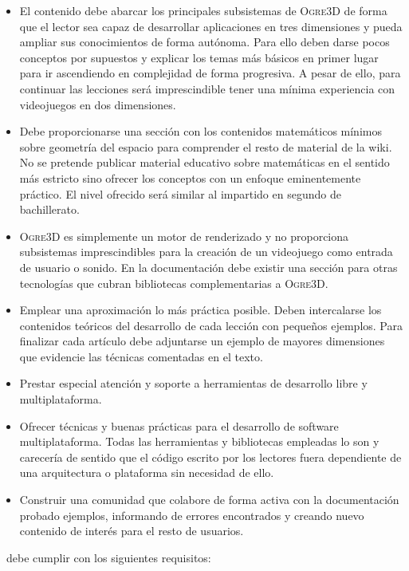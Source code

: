 \begin{itemize}
    \item El contenido debe abarcar los principales subsistemas de
    \textsc{Ogre3D} de forma que el lector sea capaz de desarrollar aplicaciones
    en tres dimensiones y pueda ampliar sus conocimientos de forma autónoma.
    Para ello deben darse pocos conceptos por supuestos y explicar los temas
    más básicos en primer lugar para ir ascendiendo en complejidad de forma
    progresiva. A pesar de ello, para continuar las lecciones será imprescindible
    tener una mínima experiencia con videojuegos en dos dimensiones.
    \item Debe proporcionarse una sección con los contenidos matemáticos
    mínimos sobre geometría del espacio para comprender el resto de material
    de la wiki. No se pretende publicar material educativo sobre matemáticas
    en el sentido más estricto sino ofrecer los conceptos con un enfoque
    eminentemente práctico. El nivel ofrecido será similar al impartido
    en segundo de bachillerato.
    \item \textsc{Ogre3D} es simplemente un motor de renderizado y no
    proporciona subsistemas imprescindibles para la creación de un videojuego
    como entrada de usuario o sonido. En la documentación debe existir una
    sección para otras tecnologías que cubran bibliotecas complementarias
    a \textsc{Ogre3D}.
    \item Emplear una aproximación lo más práctica posible. Deben intercalarse
    los contenidos teóricos del desarrollo de cada lección con pequeños
    ejemplos. Para finalizar cada artículo debe adjuntarse un ejemplo de mayores
    dimensiones que evidencie las técnicas comentadas en el texto.
    \item Prestar especial atención y soporte a herramientas de desarrollo
    libre y multiplataforma.
    \item Ofrecer técnicas y buenas prácticas para el desarrollo de software
    multiplataforma. Todas las herramientas y bibliotecas empleadas lo son
    y carecería de sentido que el código escrito por los lectores fuera
    dependiente de una arquitectura o plataforma sin necesidad de ello.
    \item Construir una comunidad que colabore de forma activa con la
    documentación probado ejemplos, informando de errores encontrados y
    creando nuevo contenido de interés para el resto de usuarios.
\end{itemize}

\juego\ debe cumplir con los siguientes requisitos:

